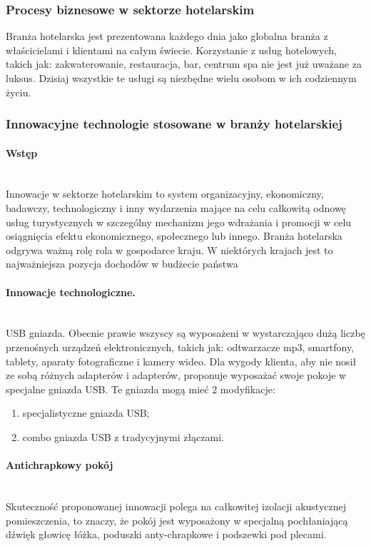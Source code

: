 \documentclass[a4paper, 12pt]{article}
\begin{document}
\subsubsection{Procesy biznesowe w sektorze hotelarskim}
Branża hotelarska jest prezentowana każdego dnia jako globalna branża z właścicielami i klientami na całym świecie. Korzystanie z usług hotelowych, takich jak: zakwaterowanie, restauracja, bar, centrum spa nie jest już uważane za luksus. Dzisiaj wszystkie te usługi są niezbędne wielu osobom w ich codziennym życiu.\newline

\subsubsection{Innowacyjne technologie stosowane w branży hotelarskiej}
\paragraph{Wstęp}\mbox{}\\
\hspace*{1cm}Innowacje w sektorze hotelarskim to system organizacyjny, ekonomiczny, badawczy, technologiczny i inny wydarzenia mające na celu całkowitą odnowę usług turystycznych w szczególny mechanizm jego wdrażania i promocji w celu osiągnięcia efektu ekonomicznego, społecznego lub innego. Branża hotelarska odgrywa ważną rolę rola w gospodarce kraju. W niektórych krajach jest to najważniejsza pozycja dochodów w budżecie państwa 
\paragraph{Innowacje technologiczne.}\mbox{}\\
\hspace*{1cm} USB gniazda. Obecnie prawie wszyscy są wyposażeni w wystarczająco dużą liczbę przenośnych urządzeń elektronicznych, takich jak:
odtwarzacze mp3, smartfony, tablety, aparaty fotograficzne i kamery wideo. Dla wygody klienta, aby nie nosił ze sobą różnych adapterów i adapterów, proponuje wyposażać swoje pokoje w specjalne gniazda USB. Te gniazda mogą mieć 2 modyfikacje:
\begin{enumerate}
	\item specjalistyczne gniazda USB;
	\item combo gniazda USB z tradycyjnymi złączami.
\end{enumerate}
\paragraph{Antichrapkowy pokój}\mbox{}\\
\hspace*{1cm} Skuteczność proponowanej innowacji polega na całkowitej izolacji akustycznej pomieszczenia, to znaczy, że pokój jest wyposażony w specjalną pochłaniającą dźwięk głowicę łóżka, poduszki anty-chrapkowe i podszewki pod plecami.
\end{document}
